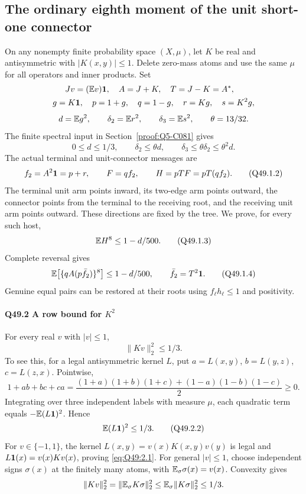 \subsection{The ordinary eighth moment of the unit short-one connector}\label{proof:Q5-C049}
On any nonempty finite probability space \((X,\allowbreak \mu)\), let \(K\) be real and antisymmetric with \(|K(x,\allowbreak y)|\le\allowbreak 1\). Delete zero-mass atoms and use the same \(\mu\) for all operators and inner products. Set
\[
\begin{gathered}
Jv=(\mathbb E v)\mathbf1,\quad A=J+K,\quad T=J-K=A^*,\quad\\
g=K\mathbf1,\quad p=1+g,\quad q=1-g,\quad r=Kg,\quad s=K^2g,
\end{gathered}
\]
\[
d=\mathbb E g^2,\qquad \delta_2=\mathbb E r^2,\qquad
\delta_3=\mathbb E s^2,\qquad \theta=13/32.
\]
The finite spectral input in Section~\ref{proof:Q5-C081} gives
\[
0\le d\le1/3,\qquad
\delta_2\le\theta d,\qquad \delta_3\le\theta\delta_2\le\theta^2d.
\tag{Q49.1.1}\label{eq:Q49:1.1}
\]
The actual terminal and unit-connector messages are
\[
f_2=A^2\mathbf1=p+r,\qquad F=qf_2,\qquad H=pTF=pT(qf_2).
\tag{Q49.1.2}\label{eq:Q49:1.2}
\]
The terminal unit arm points inward, its two-edge arm points outward, the connector points from the terminal to the receiving root, and the receiving unit arm points outward. These directions are fixed by the tree.
We prove, for every such host,
\[
\mathbb E H^8\le1-d/500.
\tag{Q49.1.3}\label{eq:Q49:1.3}
\]
Complete reversal gives
\[
\mathbb E\bigl[\{qA(p\bar f_2)\}^8\bigr]\le1-d/500,\qquad
\bar f_2=T^2\mathbf1.
\tag{Q49.1.4}\label{eq:Q49:1.4}
\]
Genuine equal pairs can be restored at their roots using \(f_\ell h_\ell\le\allowbreak 1\) and positivity.

\paragraph{Q49.2 A row bound for $K^2$}
For every real \(v\) with \(|v|\le\allowbreak 1\),
\[
\|Kv\|_2^2\le1/3.
\tag{Q49.2.1}\label{eq:Q49:2.1}
\]
To see this, for a legal antisymmetric kernel \(L\), put
\(a=\allowbreak L(x,\allowbreak y)\), \(b=\allowbreak L(y,\allowbreak z)\), \(c=\allowbreak L(z,\allowbreak x)\).
Pointwise,
\[
1+ab+bc+ca
=\frac{(1+a)(1+b)(1+c)+(1-a)(1-b)(1-c)}2\ge0.
\]
Integrating over three independent labels with measure \(\mu\), each quadratic term equals \(-\mathbb E(L\mathbf1)^2\). Hence
\[
\mathbb E(L\mathbf1)^2\le1/3.
\tag{Q49.2.2}\label{eq:Q49:2.2}
\]
For \(v\in\{-1,\allowbreak 1\}\), the kernel \(L(x,\allowbreak y)=\allowbreak v(x)K(x,\allowbreak y)v(y)\) is legal and
\(L\mathbf1(x)=\allowbreak v(x)Kv(x)\), proving \eqref{eq:Q49:2.1}.
For general \(|v|\le\allowbreak 1\), choose independent signs \(\sigma(x)\) at the finitely many atoms, with \(\mathbb E_\sigma\sigma(x)=\allowbreak v(x)\). Convexity gives
\[
\|Kv\|_2^2
=\|\mathbb E_\sigma K\sigma\|_2^2
\le\mathbb E_\sigma\|K\sigma\|_2^2\le1/3.
\]

